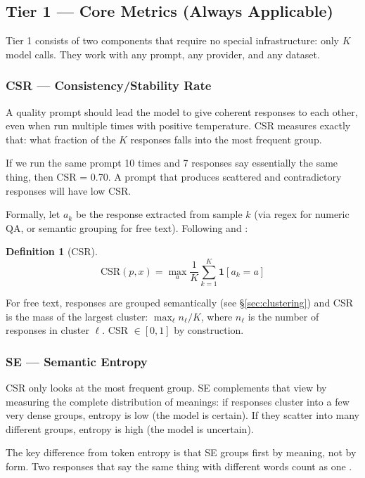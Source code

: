 \documentclass[11pt,a4paper]{article}
\newtheorem{definition}{Definition}
\begin{document}
\subsection{Tier 1 — Core Metrics (Always Applicable)}

Tier 1 consists of two components that require no special infrastructure: only $K$ model calls. They work with any prompt, any provider, and any dataset.

\subsubsection{CSR — Consistency/Stability Rate}

A quality prompt should lead the model to give coherent responses to each other, even when run multiple times with positive temperature. CSR measures exactly that: what fraction of the $K$ responses falls into the most frequent group.

If we run the same prompt 10 times and 7 responses say essentially the same thing, then CSR = 0.70. A prompt that produces scattered and contradictory responses will have low CSR.

Formally, let $a_k$ be the response extracted from sample $k$ (via regex for numeric QA, or semantic grouping for free text). Following \citet{selfconsistency2023} and \citet{glape2024}:

\begin{definition}[CSR]
\[
\mathrm{CSR}(p, x) = \max_{a} \frac{1}{K} \sum_{k=1}^{K} \mathbf{1}[a_k = a]
\]
\end{definition}

For free text, responses are grouped semantically (see \S\ref{sec:clustering}) and CSR is the mass of the largest cluster: $\max_{\ell} n_\ell / K$, where $n_\ell$ is the number of responses in cluster $\ell$. CSR $\in [0, 1]$ by construction.

\subsubsection{SE — Semantic Entropy}

CSR only looks at the most frequent group. SE complements that view by measuring the complete distribution of meanings: if responses cluster into a few very dense groups, entropy is low (the model is certain). If they scatter into many different groups, entropy is high (the model is uncertain).

The key difference from token entropy is that SE groups first by meaning, not by form. Two responses that say the same thing with different words count as one \citep{semanticentropy2024}.
\end{document}
